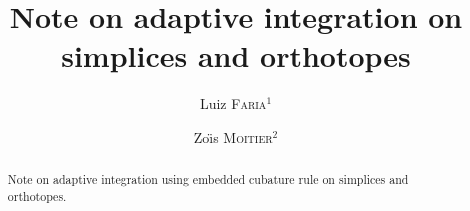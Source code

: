 \documentclass[english,12pt]{article}
\title{Note on adaptive integration on simplices and orthotopes}
\author{
    Luiz \textsc{Faria}\({}^1\)
    \and
    Zo{\"\i}s \textsc{Moitier}\({}^2\)
}
\date{\raggedright\footnotesize%
    \({^1}\)POEMS, CNRS, Inria, ENSTA Paris, Institut Polytechnique de Paris, 91120 Palaiseau, France.\\
    \({}^2\)IDEFIX, Inria, ENSTA Paris, Institut Polytechnique de Paris, 91120 Palaiseau, France.\\[1em]
    \large\Red{\textbf{\today}}
}
\numberwithin{equation}{section}
\theoremstyle{definition}
\theoremstyle{plain}
\theoremstyle{remark}
\begin{document}
\maketitle

\begin{abstract}
    Note on adaptive integration using embedded cubature rule on simplices and orthotopes.
\end{abstract}

\setcounter{tocdepth}{2}
\tableofcontents












\end{document}
